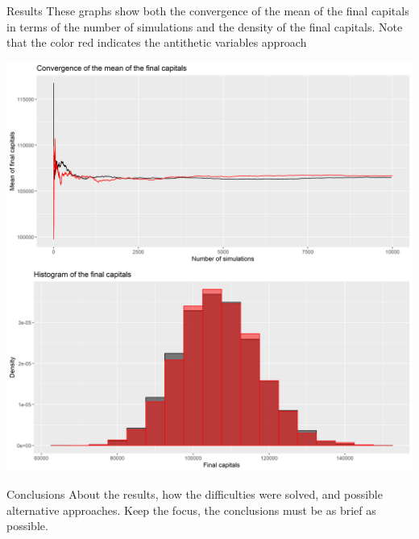\documentclass[
  ignorenonframetext,
]{beamer}
\begin{document}
\begin{frame}{Results}
\protect\hypertarget{results-1}{}
These graphs show both the convergence of the mean of the final capitals
in terms of the number of simulations and the density of the final
capitals. Note that the color red indicates the antithetic variables
approach

\includegraphics[width=0.45\linewidth]{mean_final_cap}
\includegraphics[width=0.45\linewidth]{densities_final_caps}
\end{frame}

\begin{frame}{Conclusions}
\protect\hypertarget{conclusions}{}
About the results, how the difficulties were solved, and possible
alternative approaches. Keep the focus, the conclusions must be as brief
as possible.
\end{frame}
\end{document}
